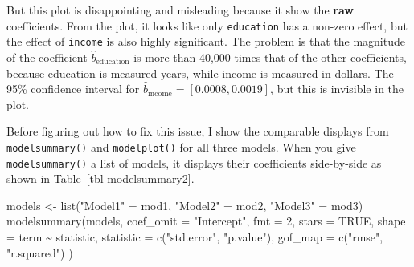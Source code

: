 \documentclass[
  letterpaper,
  10pt,
  krantz2]{krantz}
\makeatletter
\newenvironment{Shaded}{\begin{snugshade}}{\end{snugshade}}
\newcommand{\AttributeTok}[1]{\textcolor[rgb]{0.40,0.45,0.13}{#1}}
\newcommand{\ConstantTok}[1]{\textcolor[rgb]{0.56,0.35,0.01}{#1}}
\newcommand{\DecValTok}[1]{\textcolor[rgb]{0.68,0.00,0.00}{#1}}
\newcommand{\FunctionTok}[1]{\textcolor[rgb]{0.28,0.35,0.67}{#1}}
\newcommand{\NormalTok}[1]{\textcolor[rgb]{0.00,0.23,0.31}{#1}}
\newcommand{\OtherTok}[1]{\textcolor[rgb]{0.00,0.23,0.31}{#1}}
\newcommand{\SpecialCharTok}[1]{\textcolor[rgb]{0.37,0.37,0.37}{#1}}
\newcommand{\StringTok}[1]{\textcolor[rgb]{0.13,0.47,0.30}{#1}}
\newenvironment{kframe}{%
  \medskip{}
  \setlength{\fboxsep}{.8em}
  \def\at@end@of@kframe{}%
  \ifinner\ifhmode%
  \def\at@end@of@kframe{\end{minipage}}%
  \begin{minipage}{\columnwidth}%
  \fi\fi%
  \def\FrameCommand##1{\hskip\@totalleftmargin \hskip-\fboxsep
  \colorbox{shadecolor}{##1}\hskip-\fboxsep
      \hskip-\linewidth \hskip-\@totalleftmargin \hskip\columnwidth}%
  \MakeFramed {\advance\hsize-\width
    \@totalleftmargin\z@ \linewidth\hsize
    \@setminipage}}%
{\par\unskip\endMakeFramed%
  \at@end@of@kframe}
\renewenvironment{Shaded}{\begin{kframe}}{\end{kframe}}
\makeatother
\begin{document}
But this plot is disappointing and misleading because it show the
\textbf{raw} coefficients. From the plot, it looks like only
\texttt{education} has a non-zero effect, but the effect of
\texttt{income} is also highly significant. The problem is that the
magnitude of the coefficient \(\hat{b}_{\text{education}}\) is more than
40,000 times that of the other coefficients, because education is
measured years, while income is measured in dollars. The 95\% confidence
interval for \(\hat{b}_{\text{income}} = [0.0008, 0.0019]\), but this is
invisible in the plot.

Before figuring out how to fix this issue, I show the comparable
displays from \texttt{modelsummary()} and \texttt{modelplot()} for all
three models. When you give \texttt{modelsummary()} a list of models, it
displays their coefficients side-by-side as shown in
Table~\ref{tbl-modelsummary2}.

\begin{Shaded}
\begin{Highlighting}[]
\NormalTok{models }\OtherTok{\textless{}{-}} \FunctionTok{list}\NormalTok{(}\StringTok{"Model1"} \OtherTok{=}\NormalTok{ mod1, }\StringTok{"Model2"} \OtherTok{=}\NormalTok{ mod2, }\StringTok{"Model3"} \OtherTok{=}\NormalTok{ mod3)}
\FunctionTok{modelsummary}\NormalTok{(models,}
     \AttributeTok{coef\_omit =} \StringTok{"Intercept"}\NormalTok{,}
     \AttributeTok{fmt =} \DecValTok{2}\NormalTok{,}
     \AttributeTok{stars =} \ConstantTok{TRUE}\NormalTok{,}
     \AttributeTok{shape =}\NormalTok{ term }\SpecialCharTok{\textasciitilde{}}\NormalTok{ statistic,}
     \AttributeTok{statistic =} \FunctionTok{c}\NormalTok{(}\StringTok{"std.error"}\NormalTok{, }\StringTok{"p.value"}\NormalTok{),}
     \AttributeTok{gof\_map =} \FunctionTok{c}\NormalTok{(}\StringTok{"rmse"}\NormalTok{, }\StringTok{"r.squared"}\NormalTok{)}
\NormalTok{     )}
\end{Highlighting}
\end{Shaded}
\end{document}

